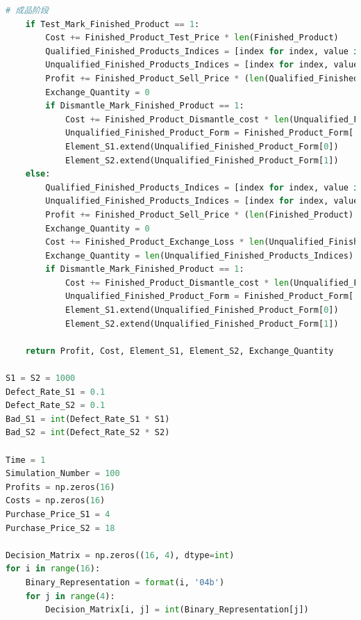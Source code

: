 \documentclass[withoutpreface,bwprint]{cumcmthesis} %
\begin{document}
\begin{appendices}
\begin{lstlisting}[language=python]
    # 成品阶段
    if Test_Mark_Finished_Product == 1:
        Cost += Finished_Product_Test_Price * len(Finished_Product)
        Qualified_Finished_Products_Indices = [index for index, value in enumerate(Finished_Product) if value == 1]
        Unqualified_Finished_Products_Indices = [index for index, value in enumerate(Finished_Product) if value == 0]
        Profit += Finished_Product_Sell_Price * (len(Qualified_Finished_Products_Indices) - Exchange_Quantity)
        Exchange_Quantity = 0
        if Dismantle_Mark_Finished_Product == 1:
            Cost += Finished_Product_Dismantle_cost * len(Unqualified_Finished_Products_Indices)
            Unqualified_Finished_Product_Form = Finished_Product_Form[:, Unqualified_Finished_Products_Indices]
            Element_S1.extend(Unqualified_Finished_Product_Form[0])
            Element_S2.extend(Unqualified_Finished_Product_Form[1])
    else:
        Qualified_Finished_Products_Indices = [index for index, value in enumerate(Finished_Product) if value == 1]
        Unqualified_Finished_Products_Indices = [index for index, value in enumerate(Finished_Product) if value == 0]
        Profit += Finished_Product_Sell_Price * (len(Finished_Product) - Exchange_Quantity)
        Exchange_Quantity = 0
        Cost += Finished_Product_Exchange_Loss * len(Unqualified_Finished_Products_Indices)
        Exchange_Quantity = len(Unqualified_Finished_Products_Indices)
        if Dismantle_Mark_Finished_Product == 1:
            Cost += Finished_Product_Dismantle_cost * len(Unqualified_Finished_Products_Indices)
            Unqualified_Finished_Product_Form = Finished_Product_Form[:, Unqualified_Finished_Products_Indices]
            Element_S1.extend(Unqualified_Finished_Product_Form[0])
            Element_S2.extend(Unqualified_Finished_Product_Form[1])

    return Profit, Cost, Element_S1, Element_S2, Exchange_Quantity

S1 = S2 = 1000
Defect_Rate_S1 = 0.1
Defect_Rate_S2 = 0.1
Bad_S1 = int(Defect_Rate_S1 * S1)
Bad_S2 = int(Defect_Rate_S2 * S2)

Time = 1
Simulation_Number = 100
Profits = np.zeros(16)
Costs = np.zeros(16)
Purchase_Price_S1 = 4
Purchase_Price_S2 = 18

Decision_Matrix = np.zeros((16, 4), dtype=int)
for i in range(16):
    Binary_Representation = format(i, '04b')
    for j in range(4):
        Decision_Matrix[i, j] = int(Binary_Representation[j])


\end{lstlisting}
\end{appendices}
\end{document}
